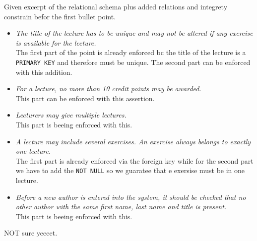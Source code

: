 \documentclass{article}
\begin{document}
\printfront

\task{}
Given excerpt of the relational schema plus added relations and integrety constrain befor the first bullet point.

\newpage
\begin{itemize}
    \item 
    \textit{The title of the lecture has to be unique and may not be altered if any exercise is
    available for the lecture.}\\
    The first part of the point is already enforced bc the title of the lecture is a \texttt{PRIMARY KEY} and therefore must be unique. The second part can be enforced with this addition.
    
    \item 
    \textit{For a lecture, no more than 10 credit points may be awarded.}\\
    This part can be enforced with this assertion.
    
    \item 
    \textit{Lecturers may give multiple lectures.}\\
    This part is beeing enforced with this.
    
    \item 
    \textit{A lecture may include several exercises. An exercise always belongs to exactly one
    lecture.}\\
    The first part is already enforced via the foreign key while for the second part we have to add the \texttt{NOT NULL} so we guaratee that e exersise must be in one lecture.
    
    \item 
    \textit{Before a new author is entered into the system, it should be checked that no other
    author with the same first name, last name and title is present.}\\
    This part is beeing enforced with this.
    

\end{itemize}


\task{}

\task{}

\task{}
NOT sure yeeeet.
\end{document}
